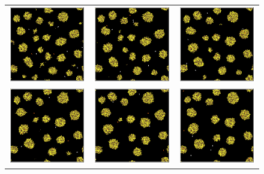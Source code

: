 \begin{enumerate}
\begin{figure}
\begin{tabular}{ccc}
        \includegraphics[width=0.3\hsize]{resources/termitas/17} &
        \includegraphics[width=0.3\hsize]{resources/termitas/18} &
        \includegraphics[width=0.3\hsize]{resources/termitas/19} \\
        
        \includegraphics[width=0.3\hsize]{resources/termitas/20} &
        \includegraphics[width=0.3\hsize]{resources/termitas/21} &
        \includegraphics[width=0.3\hsize]{resources/termitas/22} \\
    \end{tabular}
\end{figure}



\end{enumerate}
